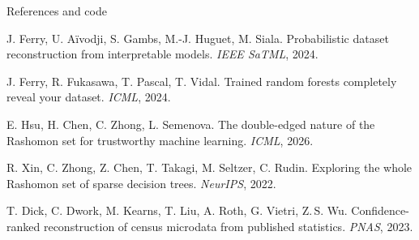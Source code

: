\documentclass{article}
\begin{document}
\begin{pbox}[toptitle=3mm,bottomtitle=1mm]{References and code}
\begin{minipage}[t]{\dimexpr\linewidth-88mm\relax}\vspace{0pt}
\fontsize{12.5}{15.5}\selectfont
\begin{enumerate}[leftmargin=2em,itemsep=2pt,topsep=0pt,label={[\arabic*]}]
\item J. Ferry, U. Aïvodji, S. Gambs, M.-J. Huguet, M. Siala. Probabilistic
  dataset reconstruction from interpretable models. \emph{IEEE SaTML}, 2024.
\item J. Ferry, R. Fukasawa, T. Pascal, T. Vidal. Trained random forests
  completely reveal your dataset. \emph{ICML}, 2024.
\item E. Hsu, H. Chen, C. Zhong, L. Semenova. The double-edged nature of the
  Rashomon set for trustworthy machine learning. \emph{ICML}, 2026.
\item R. Xin, C. Zhong, Z. Chen, T. Takagi, M. Seltzer, C. Rudin. Exploring
  the whole Rashomon set of sparse decision trees. \emph{NeurIPS}, 2022.
\item T. Dick, C. Dwork, M. Kearns, T. Liu, A. Roth, G. Vietri, Z.\,S. Wu.
  Confidence-ranked reconstruction of census microdata from published
  statistics. \emph{PNAS}, 2023.
\end{enumerate}
\end{minipage}\hfill
\begin{minipage}[t]{84mm}\vspace{0pt}
\begin{minipage}[t]{42mm}\end{minipage}\hfill
\begin{minipage}[t]{36mm}\vspace{0pt}\end{minipage}
\end{minipage}
\end{pbox}
\end{document}
